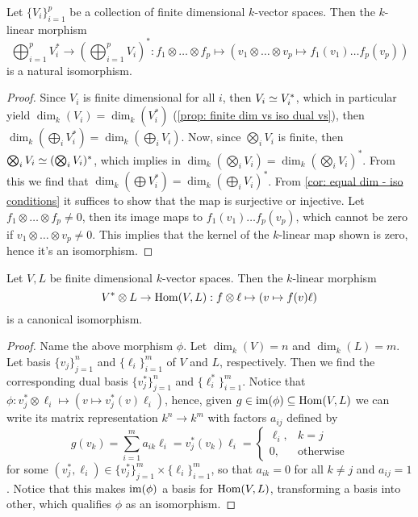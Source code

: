 \begin{proposition}\label{prop: dual tensor isomorphism}
  Let \(\{V_i\}_{i=1}^p\) be a collection of finite dimensional \(k\)-vector
  spaces. Then the \(k\)-linear morphism
  \[
    \bigoplus_{i=1}^p V_i^* \to \left( \bigoplus_{i=1}^p V_i \right)^* :
    f_1 \otimes \dots \otimes f_p \mapsto (v_1 \otimes \dots \otimes v_p \mapsto
    f_1(v_1) \dots f_p(v_p))
  \]
  is a natural isomorphism.
\end{proposition}

\begin{proof}
  Since \(V_i\) is finite dimensional for all \(i\), then \(V_i \simeq V_i^*\),
  which in particular yield \(\dim_k(V_i) = \dim_k(V_i^*)\) (\cref{prop: finite
  dim vs iso dual vs}), then \(\dim_k(\bigoplus_i V_i^*) = \dim_k(\bigoplus_i
  V_i)\). Now, since \(\bigotimes_i V_i\) is finite, then \(\bigotimes_i V_i
  \simeq (\bigotimes_i V_i)^*\), which implies in \(\dim_k(\bigotimes_i V_i) =
  \dim_k(\bigotimes_i V_i)^*\). From this we find that \(\dim_k(\bigoplus V_i^*)
  = \dim_k(\bigoplus_i V_i)^*\). From \cref{cor: equal dim - iso conditions} it
  suffices to show that the map is surjective or injective. Let \(f_1 \otimes
  \dots \otimes f_p \neq 0\), then its image maps to \(f_1(v_1) \dots
  f_p(v_p)\), which cannot be zero if \(v_1 \otimes \dots \otimes v_p \neq 0\).
  This implies that the kernel of the \(k\)-linear map shown is zero, hence it's
  an isomorphism.
\end{proof}

\begin{proposition}\label{prop: tensor with dual iso hom}
  Let \(V, L\) be finite dimensional \(k\)-vector spaces. Then the \(k\)-linear
  morphism
  \[
    V^* \otimes L \to \operatorname{Hom}(V, L) : f \otimes \ell \mapsto (v \mapsto f(v)\ell)
  \]
  is a canonical isomorphism.
\end{proposition}

\begin{proof}
  Name the above morphism \(\phi\). Let \(\dim_k(V) = n\) and \(\dim_k(L) = m\).
  Let basis \(\{v_j\}_{j=1}^n\) and \(\{\ell_i\}_{i=1}^m\) of \(V\) and \(L\),
  respectively. Then we find the corresponding dual basis \(\{v_j^*\}_{j=1}^n\)
  and \(\{\ell_i^*\}_{i=1}^m\). Notice that \(\phi :v_j^* \otimes \ell_i \mapsto
  (v \mapsto v_j^*(v) \ell_i)\), hence, given \(g \in \operatorname{im}(\phi) \subseteq
  \operatorname{Hom}(V, L)\) we can write its matrix representation \(k^n \to k^m\) with
  factors \(a_{ij}\) defined by
  \[
    g(v_k) = \sum_{i=1}^m a_{ik} \ell_i = v_j^*(v_k)\ell_i =
    \begin{cases}
      \ell_i, &k = j\\
      0, &\text{otherwise}
    \end{cases}
  \]
  for some \((v_j^*, \ell_i) \in \{v_j^*\}_{j=1}^m \times \{\ell_i\}_{i=1}^m\),
  so that \(a_{ik} = 0\) for all \(k \neq j\) and \(a_{ij} = 1\). Notice that
  this makes \(\operatorname{im}(\phi)\) a basis for \(\operatorname{Hom}(V, L)\), transforming a basis into
  other, which qualifies \(\phi\) as an isomorphism.
\end{proof}

